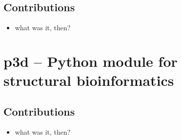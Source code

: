 \subsection*{Contributions}

\begin{itemize}
\item what was it, then?
\end{itemize}


% 
% 
% 

\cleardoublepage
\section{p3d -- Python module for structural bioinformatics}

\subsection*{Contributions}

\begin{itemize}
\item what was it, then?
\end{itemize}

